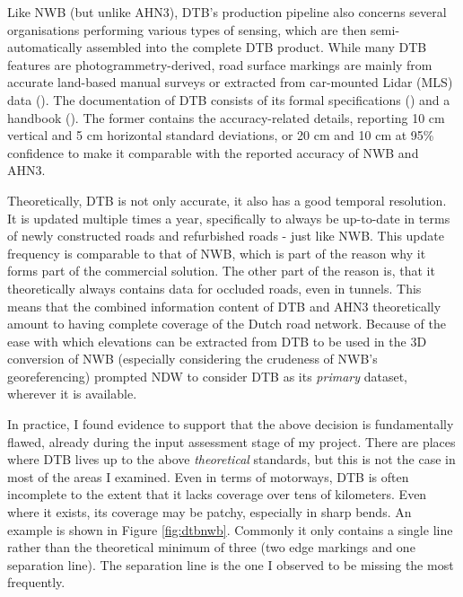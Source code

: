 Like NWB (but unlike AHN3), DTB’s production pipeline also concerns several organisations performing various types of sensing, which are then semi-automatically assembled into the complete DTB product. While many DTB features are photogrammetry-derived, road surface markings are mainly from accurate land-based manual surveys or extracted from car-mounted Lidar (MLS) data (\cite{oudeElberink_vosselman_2012}). The documentation of DTB consists of its formal specifications (\cite{dtb_docs}) and a handbook (\cite{dtb_handbook}). The former contains the accuracy-related details, reporting 10 cm vertical and 5 cm horizontal standard deviations, or 20 cm and 10 cm at 95\% confidence to make it comparable with the reported accuracy of NWB and AHN3.

Theoretically, DTB is not only accurate, it also has a good temporal resolution. It is updated multiple times a year, specifically to always be up-to-date in terms of newly constructed roads and refurbished roads - just like NWB. This update frequency is comparable to that of NWB, which is part of the reason why it forms part of the commercial solution. The other part of the reason is, that it theoretically always contains data for occluded roads, even in tunnels. This means that the combined information content of DTB and AHN3 theoretically amount to having complete coverage of the Dutch road network. Because of the ease with which elevations can be extracted from DTB to be used in the 3D conversion of NWB (especially considering the crudeness of NWB's georeferencing) prompted NDW to consider DTB as its \textit{primary} dataset, wherever it is available.

In practice, I found evidence to support that the above decision is fundamentally flawed, already during the input assessment stage of my project. There are places where DTB lives up to the above \textit{theoretical} standards, but this is not the case in most of the areas I examined. Even in terms of motorways, DTB is often incomplete to the extent that it lacks coverage over tens of kilometers. Even where it exists, its coverage may be patchy, especially in sharp bends. An example is shown in Figure \ref{fig:dtbnwb}. Commonly it only contains a single line rather than the theoretical minimum of three (two edge markings and one separation line). The separation line is the one I observed to be missing the most frequently.

